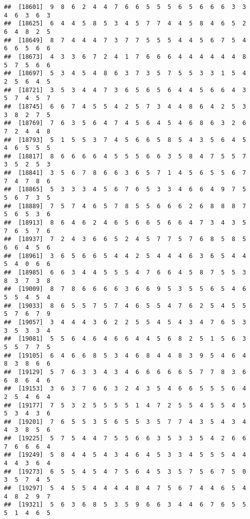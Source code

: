 \documentclass[
]{book}
\begin{document}
\begin{verbatim}
##  [18601]  9  8  6  2  4  4  7  6  6  5  5  5  6  5  6  6  6  3  3  4  6  3  6  3
##  [18625]  6  4  4  5  8  5  3  4  5  7  7  4  4  5  8  4  6  5  2  6  4  8  2  5
##  [18649]  8  7  4  4  4  7  3  7  7  5  5  5  4  4  5  6  7  5  4  6  6  5  6  6
##  [18673]  4  3  3  6  7  2  4  1  7  6  6  6  4  4  4  4  4  4  8  5  7  5  6  6
##  [18697]  5  3  4  5  4  8  6  3  7  3  5  7  5  5  3  3  1  5  4  2  5  6  4  5
##  [18721]  3  5  3  4  4  7  3  6  5  6  5  6  4  4  5  6  6  4  3  5  7  4  5  7
##  [18745]  6  6  7  4  5  5  4  2  5  7  3  4  4  8  6  4  2  5  3  3  8  2  7  5
##  [18769]  7  6  3  5  6  4  7  4  5  6  4  5  4  6  8  6  3  2  6  7  2  4  4  8
##  [18793]  5  1  5  5  3  7  4  5  6  6  5  8  5  4  3  5  6  4  5  4  6  5  5  5
##  [18817]  8  6  6  6  6  4  5  5  5  6  6  3  5  8  4  7  5  5  7  3  5  2  5  3
##  [18841]  3  5  6  7  8  6  6  3  6  5  7  1  4  5  6  5  5  6  7  7  4  7  8  6
##  [18865]  5  3  3  3  4  5  6  7  6  5  3  3  4  6  6  4  9  7  5  5  6  7  3  5
##  [18889]  7  5  7  4  6  5  7  8  5  5  6  6  6  2  6  8  8  8  7  5  6  5  3  6
##  [18913]  8  6  4  6  2  4  6  5  6  6  5  6  6  4  7  3  4  3  5  7  6  5  7  6
##  [18937]  7  2  4  3  6  6  5  2  4  5  7  7  5  7  6  8  5  8  5  6  6  4  5  6
##  [18961]  3  6  5  6  6  5  4  4  2  5  4  4  4  6  3  6  5  4  4  5  4  0  6  6
##  [18985]  6  6  3  4  4  5  5  5  4  7  6  6  4  5  8  7  5  5  3  8  3  7  3  8
##  [19009]  8  7  8  6  6  6  6  3  6  6  9  5  3  5  5  6  5  4  6  5  5  4  5  4
##  [19033]  8  6  5  5  7  5  7  4  6  5  5  4  7  6  2  5  4  5  5  5  7  6  7  9
##  [19057]  3  4  4  4  3  6  2  2  5  5  4  5  4  3  4  7  6  5  3  3  5  3  3  4
##  [19081]  5  5  6  4  6  4  6  6  4  4  5  6  8  2  5  1  5  6  3  5  5  7  7  5
##  [19105]  6  4  6  6  8  5  3  4  6  8  4  4  8  3  9  5  4  6  4  8  3  8  6  6
##  [19129]  5  7  6  3  3  4  3  4  6  6  6  6  6  5  7  7  8  3  6  6  8  6  4  6
##  [19153]  3  6  3  7  6  6  3  2  4  3  5  4  6  6  5  5  5  6  4  2  5  4  6  4
##  [19177]  7  5  3  2  5  5  5  5  1  4  7  2  5  5  4  5  5  4  5  5  3  4  3  6
##  [19201]  7  6  5  5  3  5  6  5  5  3  5  7  7  4  3  5  4  3  4  4  3  8  5  6
##  [19225]  5  7  5  4  4  7  5  5  6  6  3  5  3  3  5  4  2  6  6  7  6  6  6  4
##  [19249]  5  8  4  4  5  4  3  4  6  4  5  3  3  4  5  5  5  4  4  4  4  3  6  4
##  [19273]  6  5  5  4  5  4  7  5  6  4  5  3  5  7  5  6  7  5  0  3  5  7  4  5
##  [19297]  5  4  5  5  4  4  4  4  8  4  7  5  6  7  4  4  6  5  4  4  8  2  9  7
##  [19321]  5  6  3  6  8  5  3  5  9  6  6  3  4  4  6  7  6  5  5  5  1  4  6  5

\end{verbatim}
\end{document}
